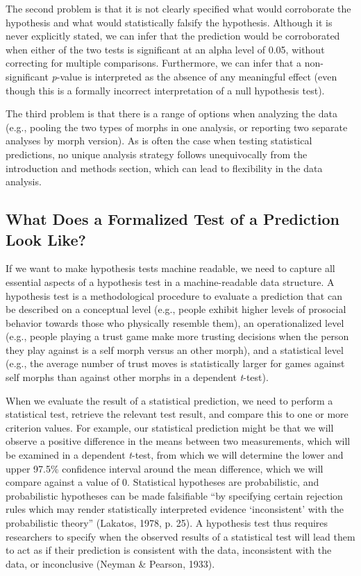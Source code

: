 \documentclass[
  english,
  doc,floatsintext]{apa6}
\begin{document}
The second problem is that it is not clearly specified what would corroborate the hypothesis and what would statistically falsify the hypothesis. Although it is never explicitly stated, we can infer that the prediction would be corroborated when either of the two tests is significant at an alpha level of 0.05, without correcting for multiple comparisons. Furthermore, we can infer that a non-significant \emph{p}-value is interpreted as the absence of any meaningful effect (even though this is a formally incorrect interpretation of a null hypothesis test).

The third problem is that there is a range of options when analyzing the data (e.g., pooling the two types of morphs in one analysis, or reporting two separate analyses by morph version). As is often the case when testing statistical predictions, no unique analysis strategy follows unequivocally from the introduction and methods section, which can lead to flexibility in the data analysis.

\hypertarget{what-does-a-formalized-test-of-a-prediction-look-like}{%
\subsection{What Does a Formalized Test of a Prediction Look Like?}\label{what-does-a-formalized-test-of-a-prediction-look-like}}

If we want to make hypothesis tests machine readable, we need to capture all essential aspects of a hypothesis test in a machine-readable data structure. A hypothesis test is a methodological procedure to evaluate a prediction that can be described on a conceptual level (e.g., people exhibit higher levels of prosocial behavior towards those who physically resemble them), an operationalized level (e.g., people playing a trust game make more trusting decisions when the person they play against is a self morph versus an other morph), and a statistical level (e.g., the average number of trust moves is statistically larger for games against self morphs than against other morphs in a dependent \emph{t}-test).

When we evaluate the result of a statistical prediction, we need to perform a statistical test, retrieve the relevant test result, and compare this to one or more criterion values. For example, our statistical prediction might be that we will observe a positive difference in the means between two measurements, which will be examined in a dependent \emph{t}-test, from which we will determine the lower and upper 97.5\% confidence interval around the mean difference, which we will compare against a value of 0. Statistical hypotheses are probabilistic, and probabilistic hypotheses can be made falsifiable \enquote{by specifying certain rejection rules which may render statistically interpreted evidence \enquote{inconsistent} with the probabilistic theory} (Lakatos, 1978, p. 25). A hypothesis test thus requires researchers to specify when the observed results of a statistical test will lead them to act as if their prediction is consistent with the data, inconsistent with the data, or inconclusive (Neyman \& Pearson, 1933).
\end{document}

